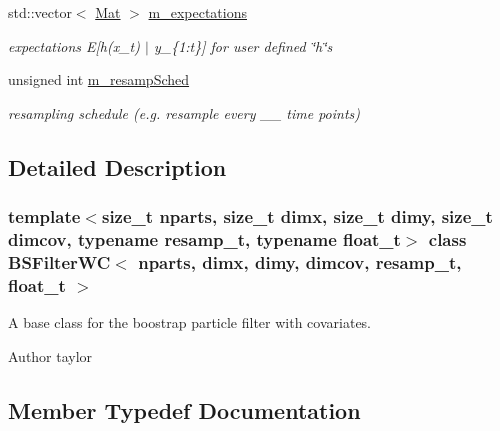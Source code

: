 \begin{DoxyCompactItemize}
\mbox{\label{classBSFilterWC_ab3c3b0f329bd3ce8980242551fb8bd37}} 
std\+::vector$<$ \hyperlink{classBSFilterWC_a507a06203a27e3a025a43be68b4b0e0e}{Mat} $>$ \hyperlink{classBSFilterWC_ab3c3b0f329bd3ce8980242551fb8bd37}{m\+\_\+expectations}
\begin{DoxyCompactList}\small\item\em expectations E\mbox{[}h(x\+\_\+t) $\vert$ y\+\_\+\{1\+:t\}\mbox{]} for user defined \char`\"{}h\char`\"{}s \end{DoxyCompactList}\item 
\mbox{\label{classBSFilterWC_a8d173dfb2640a96e97488a5cbba4444d}} 
unsigned int \hyperlink{classBSFilterWC_a8d173dfb2640a96e97488a5cbba4444d}{m\+\_\+resamp\+Sched}
\begin{DoxyCompactList}\small\item\em resampling schedule (e.\+g. resample every \+\_\+\+\_\+ time points) \end{DoxyCompactList}\end{DoxyCompactItemize}


\subsection{Detailed Description}
\subsubsection*{template$<$size\+\_\+t nparts, size\+\_\+t dimx, size\+\_\+t dimy, size\+\_\+t dimcov, typename resamp\+\_\+t, typename float\+\_\+t$>$\newline
class B\+S\+Filter\+W\+C$<$ nparts, dimx, dimy, dimcov, resamp\+\_\+t, float\+\_\+t $>$}

A base class for the boostrap particle filter with covariates. 

\begin{DoxyAuthor}{Author}
taylor 
\end{DoxyAuthor}


\subsection{Member Typedef Documentation}
\mbox{\label{classBSFilterWC_a12c3f32cb628a0efaa0267262205d6d6}} 
